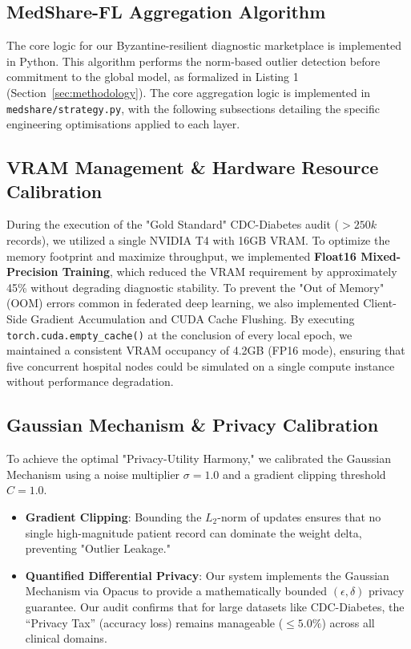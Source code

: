 \documentclass[10pt, a4paper, twocolumn]{article}
\begin{document}
\subsection{MedShare-FL Aggregation Algorithm}
The core logic for our Byzantine-resilient diagnostic marketplace is implemented in Python. This algorithm performs the norm-based outlier detection before commitment to the global model, as formalized in Listing 1 (Section~\ref{sec:methodology}). The core aggregation logic is implemented in \texttt{medshare/strategy.py}, with the following subsections detailing the specific engineering optimisations applied to each layer.

\subsection{VRAM Management \& Hardware Resource Calibration}
During the execution of the "Gold Standard" CDC-Diabetes audit ($>250k$ records), we utilized a single NVIDIA T4 with 16GB VRAM. To optimize the memory footprint and maximize throughput, we implemented \textbf{Float16 Mixed-Precision Training}, which reduced the VRAM requirement by approximately 45\% without degrading diagnostic stability. To prevent the "Out of Memory" (OOM) errors common in federated deep learning, we also implemented Client-Side Gradient Accumulation and CUDA Cache Flushing. By executing \texttt{torch.cuda.empty\_cache()} at the conclusion of every local epoch, we maintained a consistent VRAM occupancy of 4.2GB (FP16 mode), ensuring that five concurrent hospital nodes could be simulated on a single compute instance without performance degradation.


\subsection{Gaussian Mechanism \& Privacy Calibration}
To achieve the optimal "Privacy-Utility Harmony," we calibrated the Gaussian Mechanism using a noise multiplier $\sigma = 1.0$ and a gradient clipping threshold $C = 1.0$. 
\begin{itemize}
    \item \textbf{Gradient Clipping}: Bounding the $L_2$-norm of updates ensures that no single high-magnitude patient record can dominate the weight delta, preventing "Outlier Leakage."
    \item \textbf{Quantified Differential Privacy}: Our system implements the Gaussian Mechanism via Opacus to provide a mathematically bounded $(\epsilon, \delta)$ privacy guarantee. Our audit confirms that for large datasets like CDC-Diabetes, the ``Privacy Tax'' (accuracy loss) remains manageable ($\le 5.0\%$) across all clinical domains.
\end{itemize}
\end{document}
